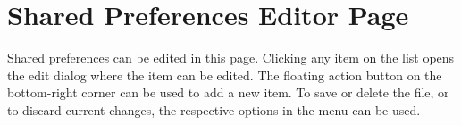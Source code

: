 \section{Shared Preferences Editor Page}\label{sec:shared-preferences-editor-page} %
Shared preferences can be edited in this page. Clicking any item on the list opens the edit dialog where the item can be
edited. The floating action button on the bottom-right corner can be used to add a new item. To save or delete the file,
or to discard current changes, the respective options in the menu can be used.
